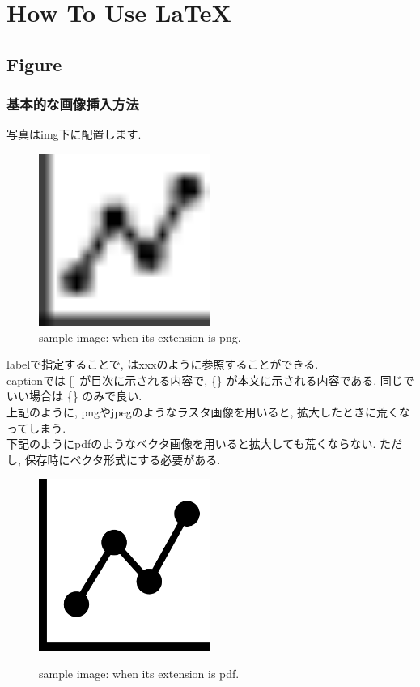 \chapter{How To Use \LaTeX}

\section{Figure}
    \subsection{基本的な画像挿入方法}
    写真はimg下に配置します.\\
    \begin{figure}[htbp]
        \centering   
        \includegraphics[width=0.5\textwidth]{img/sample/sample_png.png}
        \caption[sample image (png)]{sample image: when its extension is png.}
        \label{fig:sample_png}
    \end{figure}
    labelで指定することで, はxxxのように参照することができる.\\
    captionでは [] が目次に示される内容で, \{\} が本文に示される内容である. 同じでいい場合は \{\} のみで良い.\\
    上記のように, pngやjpegのようなラスタ画像を用いると, 拡大したときに荒くなってしまう.\\
    下記のようにpdfのようなベクタ画像を用いると拡大しても荒くならない.
    ただし, 保存時にベクタ形式にする必要がある.
    \begin{figure}[htbp]
        \centering   
        \includegraphics[width=0.5\textwidth]{img/sample/sample_pdf.pdf}
        \label{Fig:sample_pdf}
        \caption[sample image (pdf)]{sample image: when its extension is pdf.}
    \end{figure}
